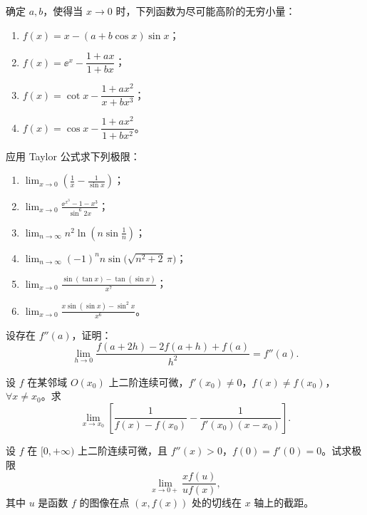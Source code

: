 \begin{xexercise}[3]
确定 $a,b$，使得当 $x\to0$ 时，下列函数为尽可能高阶的无穷小量：
  \begin{enumerate}[label=(\arabic*)]
    \item $f(x)=x-(a+b\cos x)\sin x$；
    \item $f(x)=\ee^x-\dfrac{1+ax}{1+bx}$；
    \item $f(x)=\cot x-\dfrac{1+ax^2}{x+bx^3}$；
    \item $f(x)=\cos x-\dfrac{1+ax^2}{1+bx^2}$。
  \end{enumerate}
\end{xexercise}

\begin{xexercise}[4]
应用 Taylor 公式求下列极限：
  \begin{enumerate}[label=(\arabic*)]
    \item $\displaystyle\lim_{x\to0}\left(\frac1x-\frac1{\sin x}\right)$；
    \item $\displaystyle\lim_{x\to0}\frac{\ee^{x^3}-1-x^3}{\sin^6 2x}$；
    \item $\displaystyle\lim_{n\to\infty}n^2\ln\left(n\sin\frac1n\right)$；
    \item $\displaystyle\lim_{n\to\infty}(-1)^n n\sin\bigl(\sqrt{n^2+2}\,\pi\bigr)$；
    \item $\displaystyle\lim_{x\to0}\frac{\sin(\tan x)-\tan(\sin x)}{x^7}$；
    \item $\displaystyle\lim_{x\to0}\frac{x\sin(\sin x)-\sin^2x}{x^6}$。
  \end{enumerate}
\end{xexercise}

\begin{xexercise}[5]
设存在 $f''(a)$，证明：
  \[
    \lim_{h\to0}\frac{f(a+2h)-2f(a+h)+f(a)}{h^2}=f''(a).
  \]
\end{xexercise}

\begin{xexercise}[6]
设 $f$ 在某邻域 $O(x_0)$ 上二阶连续可微，$f'(x_0)\ne0$，$f(x)\ne f(x_0)$，$\forall x\ne x_0$。求
  \[
    \lim_{x\to x_0}\left[\frac1{f(x)-f(x_0)}-\frac1{f'(x_0)(x-x_0)}\right].
  \]
\end{xexercise}

\begin{xexercise}[7]
设 $f$ 在 $[0,+\infty)$ 上二阶连续可微，且 $f''(x)>0$，$f(0)=f'(0)=0$。试求极限
  \[
    \lim_{x\to0+}\frac{xf(u)}{uf(x)},
  \]
  其中 $u$ 是函数 $f$ 的图像在点 $(x,f(x))$ 处的切线在 $x$ 轴上的截距。
\end{xexercise}

